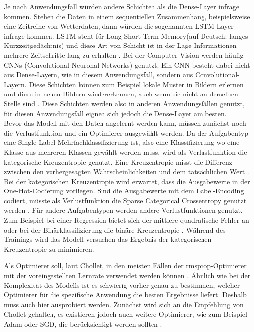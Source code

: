 Je nach Anwendungsfall würden andere Schichten als die Dense-Layer infrage kommen. Stehen die Daten in einem sequentiellen Zusammenhang, beispielsweise eine Zeitreihe von Wetterdaten, dann würden
die sogenannten LSTM-Layer infrage kommen. LSTM steht für Long Short-Term-Memory(auf Deutsch: langes Kurzzeitgedächtnis) und diese Art von Schicht ist in der Lage Informationen mehrere Zeitschritte
lang zu erhalten \cite[vgl. S.260]{DL_PY}. Bei der Computer Vision werden häufig CNNs (Convolutional Neuronal Networks) genutzt. Ein CNN besteht dabei nicht aus Dense-Layern, wie in diesem 
Anwendungsfall, sondern aus Convolutional-Layern. Diese Schichten können zum Beispiel lokale Muster in Bildern erlernen und diese in neuen Bildern wiedererkennen, auch wenn sie nicht an derselben Stelle
sind \cite[vgl. S.164]{DL_PY}. Diese Schichten werden also in anderen Anwendungsfällen genutzt, für diesen Anwendungsfall eignen sich jedoch die Dense-Layer am besten.    \\

Bevor das Modell mit den Daten angelernt werden kann, müssen zunächst noch die Verlustfunktion und ein Optimierer ausgewählt werden. Da der Aufgabentyp eine Single-Label-Mehrfachklassifizierung 
ist, also eine Klassifizierung wo eine Klasse aus mehreren Klassen gewählt werden muss, wird als Verlustfunktion die kategorische Kreuzentropie genutzt. 
Eine Kreuzentropie misst die Differenz zwischen den vorhergesagten Wahrscheinlichkeiten und dem tatsächlichen Wert \cite[vgl. S.102]{DL_PY}.
Bei der kategorischen Kreuzentropie wird erwartet, dass die Ausgabewerte in der One-Hot-Codierung vorliegen. Sind die Ausgabewerte mit dem Label-Encoding codiert,
müsste als Verlustfunktion die \glqq Sparse Categorical Crossentropy\grqq{} genutzt werden \cite{KerasDoc}. Für andere Aufgabentypen werden andere 
Verlustfunktionen genutzt. Zum Beispiel bei einer Regression bietet sich der mittlere quadratische Fehler an oder bei der Binärklassifizierung die binäre Kreuzentropie \cite[vgl. S.155]{DL_PY}.
Während des Trainings wird das Modell versuchen das Ergebnis der kategorischen Kreuzentropie zu minimieren. 

Als Optimierer soll, laut Chollet, in den meisten Fällen der \glqq rmsprop\grqq{}-Optimierer mit der voreingestellten Lernrate verwendet werden können \cite[vgl. S.155]{DL_PY}. Ähnlich wie bei 
der Komplexität des Modells ist es schwierig vorher genau zu bestimmen, welcher Optimierer für die spezifische Anwendung die besten Ergebnisse liefert. Deshalb muss auch hier ausprobiert werden.
Zunächst wird sich an die Empfehlung von Chollet gehalten, es existieren jedoch auch weitere Optimierer, wie zum Beispiel \glqq Adam\grqq{} oder \glqq SGD\grqq{}, die berücksichtigt 
werden sollten \cite{KerasDoc}. 

